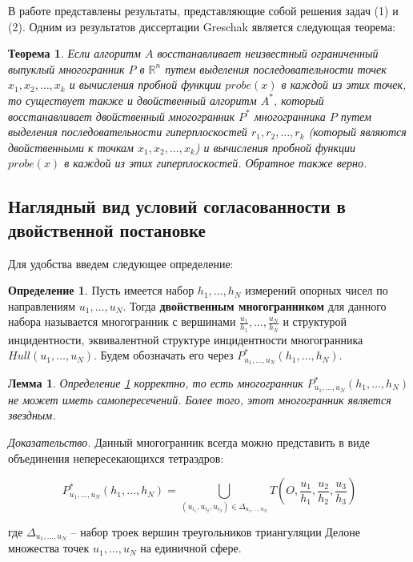 \documentclass[a4paper, 12pt, titlepage]{article}
\theoremstyle{definition}
\newtheorem{SmartDefinition}{Определение}
\theoremstyle{plain}
\newtheorem{SmartTheorem}{Теорема}
\theoremstyle{plain}
\newtheorem{SmartLemma}{Лемма}
\begin{document}
В работе представлены результаты, представляющие собой решения задач (1) и 
(2). Одним из результатов диссертации Greschak является следующая теорема:

\begin{SmartTheorem}
 Если алгоритм $A$ восстанавливает неизвестный ограниченный выпуклый 
 многогранник $P$ в $\mathbb{R}^{n}$ путем выделения последовательности точек
 $x_{1}, x_{2}, \ldots, x_{k}$ и вычисления пробной функции $probe(x)$ в каждой 
 из этих точек, то существует также и двойственный алгоритм $A^{*}$, который
 восстанавливает двойственный многогранник $P^{*}$ многогранника $P$ путем
 выделения последовательности гиперплоскостей $r_{1}, r_{2}, \ldots, r_{k}$
 (который являются двойственными к точкам $x_{1}, x_{2}, \ldots, x_{k}$)
 и вычисления пробной функции $probe(x)$ в каждой из этих гиперплоскостей.
 Обратное также верно.
\end{SmartTheorem}


\subsection{Наглядный вид условий согласованности в двойственной постановке}

Для удобства введем следующее определение:

\begin{SmartDefinition}
 \label{def:dual-polyhedron-for-support-vector}
 Пусть имеется набор $h_{1}, \ldots, h_{N}$ измерений опорных чисел по
 направлениям $u_{1}, \ldots, u_{N}$. Тогда \textbf{двойственным многогранником}
 для данного набора называется многогранник с вершинами $\frac{u_{1}}{h_{1}},
 \ldots, \frac{u_{N}}{h_{N}}$ и структурой инцидентности, эквивалентной
 структуре инцидентности многогранника $Hull(u_{1}, \ldots, u_{N})$. Будем
 обозначать его через $P^{*}_{u_{1}, \ldots, u_{N}}(h_{1}, \ldots, h_{N})$.
\end{SmartDefinition}

\begin{SmartLemma}
 \label{lem:dual-polyhedron-for-support-vector-correctness}
 Определение \ref{def:dual-polyhedron-for-support-vector} корректно, то есть
 многогранник $P^{*}_{u_{1}, \ldots, u_{N}}(h_{1}, \ldots, h_{N})$ не может
 иметь самопересечений. Более того, этот многогранник является звездным.
\end{SmartLemma}

\begin{flushleft}
 \textit{Доказательство.} Данный многогранник всегда можно представить в виде
 объединения непересекающихся тетраэдров:

 \begin{equation}
  P^{*}_{u_{1}, \ldots, u_{N}}(h_{1}, \ldots, h_{N}) =
  \bigcup \limits_{(u_{i_{1}}, u_{i_{2}}, u_{i_{3}}) \in 
  \Delta_{u_{1}, \ldots, u_{N}}}
  T \left(O, \frac{u_{1}}{h_{1}}, \frac{u_{2}}{h_{2}}, 
  \frac{u_{3}}{h_{3}}\right)
 \end{equation}

 где $\Delta_{u_{1}, \ldots, u_{N}}$ -- набор троек вершин треугольников 
 триангуляции Делоне множества точек $u_{1}, \ldots, u_{N}$ на единичной сфере.

 \Square
\end{flushleft}
\end{document}
